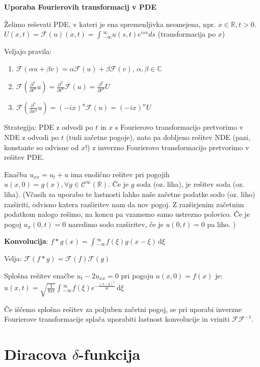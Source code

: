 \documentclass[11pt,a4paper]{amsart}
\theoremstyle{definition} %
\theoremstyle{plain} %
\newcommand{\dxi}{\ensuremath{\,\mathrm{d}\xi}}
\let\oldint\int
\renewcommand{\int}{\oldint \!}
\newcommand{\R}{\mathbb R}
\newcommand{\C}{\mathbb C}
\newcommand{\F}{\mathcal{F}}
\newcommand{\Cont}{\mathcal{C}}
\begin{document}
\textbf{Uporaba Fourierovih transformacij v PDE}

Želimo reševati PDE, v kateri je ena spremenljivka neomejena, npr. $x \in \R, t > 0$.
$U(x,t) =  \F(u)(x,t) = \int_{-\infty}^\infty u(s,t)e^{isx}ds$ (transformacija po $x$)

Veljajo pravila:
\begin{enumerate}

\item $\F(\alpha u + \beta v) = \alpha \F(u) + \beta \F (v)$, $\alpha , \beta \in \C$

\item $\F(\frac{\partial^n}{\partial t^n} u) = \frac{\partial^n}{\partial t^n}\F(u) = \frac{\partial^n}{\partial t^n} U$

\item $\F(\frac{\partial^n}{\partial x^n}u) = (-ix)^n \F(u) = (-ix)^n U$

\end{enumerate}

Strategija: PDE z odvodi po $t$ in $x$ s Fourierovo transformacijo pretvorimo v NDE z odvodi po $t$ (tudi začetne pogoje), nato pa dobljeno rešitev NDE (pazi, konstante so odvisne od $x$!) z inverzno Fourierovo transformacijo pretvorimo v rešitev PDE.

Enačba $u_{xx} = u_t + u$ ima enolično rešitev pri pogojih $u(x,0)=g(x), \forall g \in \Cont^\infty (\R)$. Če je $g$ soda (oz. liha), je rešitev soda (oz. liha). (Včasih za uporabo te lastnosti lahko naše začetne podatke sodo (oz. liho) razširiti, odvisno katera razširitev nam da nov pogoj. Z razširjenim začetnim podatkom nalogo rešimo, na koncu pa vzamemo samo ustrezno polovico. Če je pogoj $u_x(0, t)= 0$ naredimo sodo razširitev, če je $u(0, t)= 0$ pa liho. )

\textbf{Konvolucija}: $f \ast g (x) = \int_{-\infty}^\infty f(\xi) g(x-\xi) \dxi$

Velja: $\F (f \ast g) = \F(f) \F (g)$

Splošna rešitev enačbe $u_t - 2u_{xx} = 0$ pri pogoju $u(x,0) = f(x)$ je: $u(x,t) = \sqrt{ \frac{1}{8 \pi t}} \int_{-\infty}^\infty f(\xi) e^{- \frac{(x- \xi )^2}{8t}} \dxi$

Če iščemo splošno rešitev za poljuben začetni pogoj, se pri uporabi inverzne Fourierove transformacije splača uporabiti lastnost konvolucije in vriniti $\F \F^{-1}$.


\vspace{-0.4cm}
\section*{Diracova $\delta$-funkcija}
\end{document}
